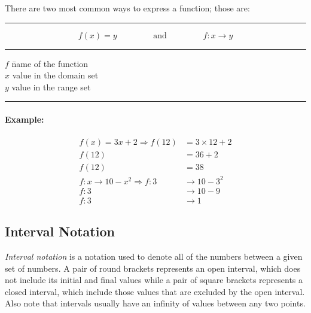 \documentclass[a5paper,9pt]{book}
\theoremstyle{definition}
\newcommand{\nomlinesur}[2]{%
    \vspace*{\baselineskip}

    \hrule%

    \vspace*{\medskipamount}

    #1

    \vspace*{\medskipamount}

    \hrule%

    \vspace*{\medskipamount}
    
    #2

    \vspace*{\medskipamount}

    \hrule

    \vspace*{\baselineskip}
}
\newcommand{\Rarr}{\Rightarrow}
\begin{document}
        There are two most common ways to express a function; those are:

        \nomlinesur{%
            \begin{equation*}
                f(x) = y \qquad\qquad\text{ and }\qquad\qquad f:x \rightarrow y
            \end{equation*}
        }{%
            \vspace*{-0.75\baselineskip}

            \begin{tabbing}
                $f$ \hspace{15pt}\= name of the function \\
                $x$ \> value in the domain set \\
                $y$ \> value in the range set
            \end{tabbing}

            \vspace*{-0.75\baselineskip}
        }

        \paragraph{Example:}

        \begin{align*}
            f(x) = 3x + 2 \Rarr f(12) &= 3\times 12 + 2 \\
            f(12) &= 36 + 2 \\
            f(12) &= 38 \\[15pt]
            f:x\rightarrow 10 - x^2 \Rarr f:3 &\rightarrow 10 - 3^2 \\
            f:3 &\rightarrow 10 - 9 \\
            f:3 &\rightarrow 1
        \end{align*}

        \pagebreak

        \subsection{Interval Notation}

        \emph{Interval notation} is a notation used to denote all of the numbers between
        a given set of numbers. A pair of round brackets represents an open interval,
        which does not include its initial and final values while a pair of square brackets
        represents a closed interval, which include those values that are excluded by
        the open interval. Also note that intervals usually have an infinity of values
        between any two points.
\end{document}
